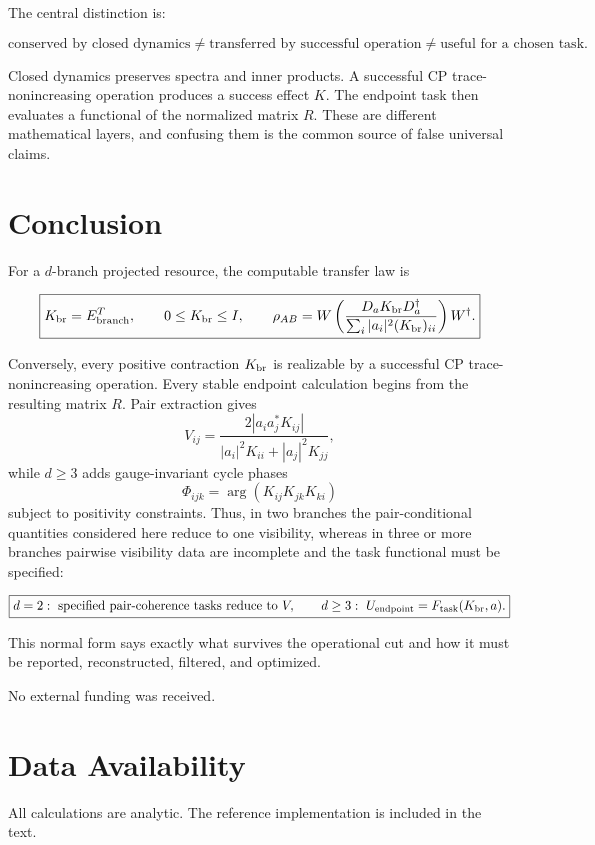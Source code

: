 \documentclass[reprint,aps,pra,superscriptaddress,nofootinbib,longbibliography]{revtex4-2}
\begin{document}
The central distinction is:
\begin{widetext}
\[
\boxed{
\text{conserved by closed dynamics}
\ne
\text{transferred by successful operation}
\ne
\text{useful for a chosen task}.
}
\]
\end{widetext}
Closed dynamics preserves spectra and inner products.  A successful CP trace-nonincreasing operation produces a success effect \(K\).  The endpoint task then evaluates a functional of the normalized matrix \(R\).  These are different mathematical layers, and confusing them is the common source of false universal claims.

\section{Conclusion}

For a \(d\)-branch projected resource, the computable transfer law is
\begin{widetext}
\[
\boxed{
K_{\rm br}=E^T_{\rm branch},\qquad
0\le K_{\rm br}\le I,\qquad
\rho_{AB}
=
W
\left(
\frac{D_aK_{\rm br}D_a^\dagger}
{\sum_i|a_i|^2(K_{\rm br})_{ii}}
\right)
W^\dagger .
}
\]
\end{widetext}
Conversely, every positive contraction \(K_{\rm br}\) is realizable by a successful CP trace-nonincreasing operation.  Every stable endpoint calculation begins from the resulting matrix \(R\).  Pair extraction gives
\[
V_{ij}
=
\frac{2|a_i a_j^*K_{ij}|}
{|a_i|^2K_{ii}+|a_j|^2K_{jj}},
\]
while \(d\ge3\) adds gauge-invariant cycle phases
\[
\Phi_{ijk}=\arg(K_{ij}K_{jk}K_{ki})
\]
subject to positivity constraints.  Thus, in two branches the pair-conditional quantities considered here reduce to one visibility, whereas in three or more branches pairwise visibility data are incomplete and the task functional must be specified:
\begin{widetext}
\[
\boxed{
d=2:\ \text{specified pair-coherence tasks reduce to }V,
\qquad
d\ge3:\ U_{\rm endpoint}=F_{\rm task}(K_{\rm br},a).
}
\]
\end{widetext}
This normal form says exactly what survives the operational cut and how it must be reported, reconstructed, filtered, and optimized.

\begin{acknowledgments}
No external funding was received.
\end{acknowledgments}

\section*{Data Availability}
All calculations are analytic.  The reference implementation is included in the text.
\end{document}
